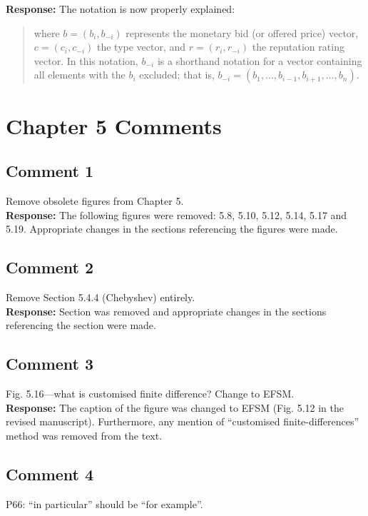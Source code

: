 \documentclass[10pt,a4paper,notitlepage]{article}
\numberwithin{equation}{section}
\begin{document}
\textbf{Response:}
The notation is now properly explained:
\begin{quote}
where $b = (b_i,b_{-i})$ represents the monetary bid (or offered price) vector, $c = (c_i, c_{-i})$ the type vector, and $r = (r_i, r_{-i})$ the reputation rating vector. In this notation, $b_{-i}$ is a shorthand notation for a vector containing all elements with the $b_i$ excluded; that is, $b_{-i} = (b_1, \ldots, b_{i-1}, b_{i+1}, \ldots, b_n)$.
\end{quote}

\clearpage

\section{Chapter 5 Comments}
\subsection{Comment 1}
Remove obsolete figures from Chapter 5.\\[-2ex]

\textbf{Response:}
The following figures were removed: 5.8, 5.10, 5.12, 5.14, 5.17 and 5.19. Appropriate changes in the sections referencing the figures were made.

\subsection{Comment 2}
Remove Section 5.4.4 (Chebyshev) entirely.\\[-2ex]

\textbf{Response:}
Section was removed and appropriate changes in the sections referencing the section were made.

\subsection{Comment 3}
Fig. 5.16---what is customised finite difference? Change to EFSM.\\[-2ex]

\textbf{Response:}
The caption of the figure was changed to EFSM (Fig. 5.12 in the revised manuscript). Furthermore, any mention of ``customised finite-differences'' method was removed from the text.

\subsection{Comment 4}
P66: ``in particular'' should be ``for example''.\\[-2ex]
\end{document}
